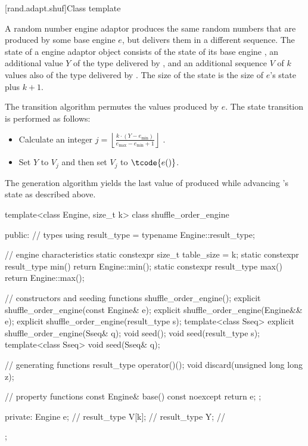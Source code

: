 [rand.adapt.shuf]{Class template }%
%

\pnum
A  random number engine adaptor
produces the same random numbers
that are produced by some base engine $e$,
but delivers them in a different sequence.
The state%
%
of a  engine adaptor object 
consists of
 the state  of its base engine ,
 an additional value $Y$ of the type delivered by ,
and
 an additional sequence $V$ of $k$ values
 also of the type delivered by .
The size of the state is
 the size of $e$'s state plus $k + 1$.

\pnum
The transition algorithm%
%
permutes the values produced by $e$.
The state transition is performed as follows:
\begin{itemize}
 \item
   Calculate an integer
   $j = \left\lfloor \frac{k \cdot (Y - e_{\min})}
                          {e_{\max} - e_{\min} +1}
        \right\rfloor
   $%
   .
 \item
   Set $Y$ to $V_j$ and then set $V_j$ to $\tcode{e()}$.
\end{itemize}

\pnum
The generation algorithm%
%
yields the last value of 
 produced while advancing 's state as described above.

%
\begin{codeblock}
template<class Engine, size_t k>
  class shuffle_order_engine {
  public:
    // types
    using result_type = typename Engine::result_type;

    // engine characteristics
    static constexpr size_t table_size = k;
    static constexpr result_type min() { return Engine::min(); }
    static constexpr result_type max() { return Engine::max(); }

    // constructors and seeding functions
    shuffle_order_engine();
    explicit shuffle_order_engine(const Engine& e);
    explicit shuffle_order_engine(Engine&& e);
    explicit shuffle_order_engine(result_type s);
    template<class Sseq> explicit shuffle_order_engine(Sseq& q);
    void seed();
    void seed(result_type s);
    template<class Sseq> void seed(Sseq& q);

    // generating functions
    result_type operator()();
    void discard(unsigned long long z);

    // property functions
    const Engine& base() const noexcept { return e; };

  private:
    Engine e;           // \expos
    result_type V[k];   // \expos
    result_type Y;      // \expos
  };
\end{codeblock}

